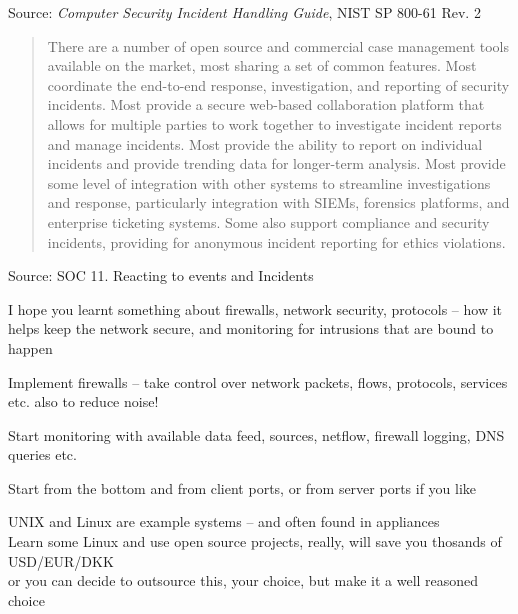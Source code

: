 \documentclass[Screen16to9,17pt]{foils}
\begin{document}


Source: \emph{Computer Security Incident Handling Guide}, NIST SP 800-61 Rev. 2





\begin{quote}
There are a number of open source and commercial case management tools available on the market, most sharing a set of common features. Most coordinate the end-to-end response, investigation, and reporting of security incidents. Most provide a secure web-based collaboration platform that allows for multiple parties to work together to investigate incident reports and manage incidents. Most provide the ability to report on individual incidents and provide trending data for longer-term analysis. Most provide some level of integration with other systems to streamline investigations and response, particularly integration with SIEMs, forensics platforms, and enterprise ticketing systems. Some also support compliance and security incidents, providing for anonymous incident reporting for ethics violations.
\end{quote}
Source:  SOC 11. Reacting to events and Incidents



I hope you learnt something about firewalls, network security, protocols -- how it helps keep the network secure, and monitoring for intrusions that are bound to happen

\begin{list2}
\item Implement firewalls – take control over network packets, flows, protocols, services etc.
also to reduce noise!
\item Start monitoring with available data feed, sources, netflow, firewall logging, DNS queries etc.
\item Start from the bottom and from client ports, or from server ports if you like

\item UNIX and Linux are example systems -- and often found in appliances\\
Learn some Linux and use open source projects, really, will save you thosands of USD/EUR/DKK\\
or you can decide to outsource this, your choice, but make it a well reasoned choice

\end{list2}
\end{document}
